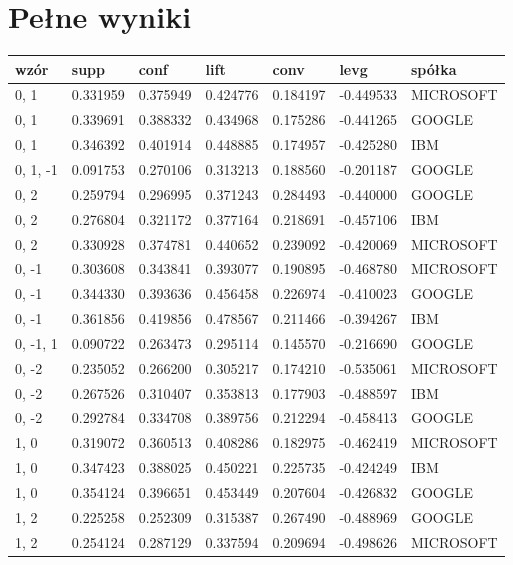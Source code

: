 \documentclass[a4paper,10pt]{article}
\begin{document}
\section{Pełne wyniki}
\begin{tabular}{|l|l|l|l|l|l|l|} 
wzór & supp & conf & lift & conv & levg & spółka \\ \hline
0, 1 & 0.331959 & 0.375949 & 0.424776 & 0.184197 & -0.449533 & MICROSOFT \\ \hline
0, 1 & 0.339691 & 0.388332 & 0.434968 & 0.175286 & -0.441265 & GOOGLE \\ \hline
0, 1 & 0.346392 & 0.401914 & 0.448885 & 0.174957 & -0.425280 & IBM \\ \hline
0, 1, -1 & 0.091753 & 0.270106 & 0.313213 & 0.188560 & -0.201187 & GOOGLE \\ \hline
0, 2 & 0.259794 & 0.296995 & 0.371243 & 0.284493 & -0.440000 & GOOGLE \\ \hline
0, 2 & 0.276804 & 0.321172 & 0.377164 & 0.218691 & -0.457106 & IBM \\ \hline
0, 2 & 0.330928 & 0.374781 & 0.440652 & 0.239092 & -0.420069 & MICROSOFT \\ \hline
0, -1 & 0.303608 & 0.343841 & 0.393077 & 0.190895 & -0.468780 & MICROSOFT \\ \hline
0, -1 & 0.344330 & 0.393636 & 0.456458 & 0.226974 & -0.410023 & GOOGLE \\ \hline
0, -1 & 0.361856 & 0.419856 & 0.478567 & 0.211466 & -0.394267 & IBM \\ \hline
0, -1, 1 & 0.090722 & 0.263473 & 0.295114 & 0.145570 & -0.216690 & GOOGLE \\ \hline
0, -2 & 0.235052 & 0.266200 & 0.305217 & 0.174210 & -0.535061 & MICROSOFT \\ \hline
0, -2 & 0.267526 & 0.310407 & 0.353813 & 0.177903 & -0.488597 & IBM \\ \hline
0, -2 & 0.292784 & 0.334708 & 0.389756 & 0.212294 & -0.458413 & GOOGLE \\ \hline
1, 0 & 0.319072 & 0.360513 & 0.408286 & 0.182975 & -0.462419 & MICROSOFT \\ \hline
1, 0 & 0.347423 & 0.388025 & 0.450221 & 0.225735 & -0.424249 & IBM \\ \hline
1, 0 & 0.354124 & 0.396651 & 0.453449 & 0.207604 & -0.426832 & GOOGLE \\ \hline
1, 2 & 0.225258 & 0.252309 & 0.315387 & 0.267490 & -0.488969 & GOOGLE \\ \hline
1, 2 & 0.254124 & 0.287129 & 0.337594 & 0.209694 & -0.498626 & MICROSOFT \\ \hline

\end{tabular}
\end{document}
